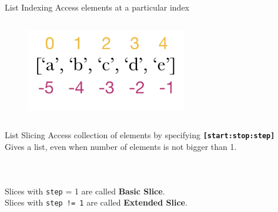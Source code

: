        \begin{frame}{List Indexing}
            \LARGE
            Access elements at a particular index
            \begin{columns}
            \begin{column}{0.5\textwidth}
                \vspace{-5mm}
                \begin{figure}[H]
                    \bigskip
                    \includegraphics[width=70mm]{../Lecture3/code-examples/index.png}
                    \end{figure}    
            \end{column}
            \begin{column}{0.5\textwidth}
                \inputminted[frame=single,framesep=2pt, lastline=8]{python3}{../Lecture3/code-examples/index.py}
            \end{column} 
            \end{columns}
        \end{frame}

        \begin{frame}{List Slicing}
            \LARGE
            Access collection of elements by specifying \textbf{\texttt{[start:stop:step]}}\\
            Gives a list, even when number of elements is not bigger than 1.
            \normalsize
            \vspace{-2mm}
            \begin{columns}
                \begin{column}{0.5\textwidth}
                    \inputminted[frame=single,framesep=2pt,lastline=9]{python3}{../Review1/code-examples/slicing.py}                        
                \end{column}                
                \begin{column}{0.5\textwidth}
                    \inputminted[frame=single,framesep=2pt,firstline=10]{python3}{../Review1/code-examples/slicing.py}                                
                \end{column}
            \end{columns}
            \vspace{2mm}
            \LARGE
            Slices with \texttt{step} = 1 are called \textbf{Basic Slice}.\\
            Slices with \texttt{step != 1} are called \textbf{Extended Slice}.
        \end{frame}

